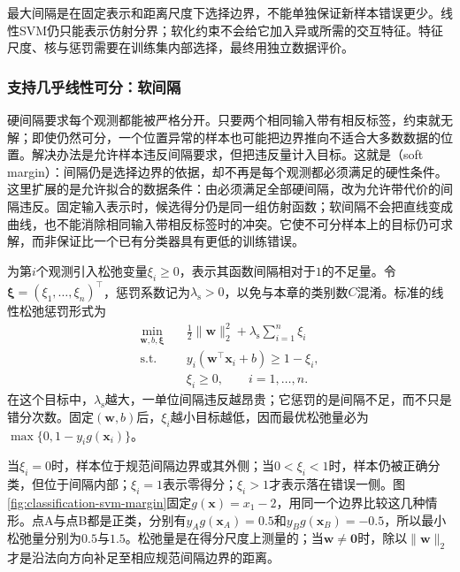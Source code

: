 最大间隔是在固定表示和距离尺度下选择边界，不能单独保证新样本错误更少。线性SVM仍只能表示仿射分界；软化约束不会给它加入异或所需的交互特征。特征尺度、核与惩罚需要在训练集内部选择，最终用独立数据评价。

\subsubsection{支持几乎线性可分：软间隔}
\label{sec:classification-svm-soft-margin}

硬间隔要求每个观测都能被严格分开。只要两个相同输入带有相反标签，约束就无解；即使仍然可分，一个位置异常的样本也可能把边界推向不适合大多数数据的位置。解决办法是允许样本违反间隔要求，但把违反量计入目标。这就是（soft margin）：间隔仍是选择边界的依据，却不再是每个观测都必须满足的硬性条件。这里扩展的是允许拟合的数据条件：由必须满足全部硬间隔，改为允许带代价的间隔违反。固定输入表示时，候选得分仍是同一组仿射函数；软间隔不会把直线变成曲线，也不能消除相同输入带相反标签时的冲突。它使不可分样本上的目标仍可求解，而非保证比一个已有分类器具有更低的训练错误。

为第$i$个观测引入松弛变量$\xi_i\ge0$，表示其函数间隔相对于$1$的不足量。令$\bm{\xi}=(\xi_1,\ldots,\xi_n)^{\top}$，惩罚系数记为$\lambda_{\mathrm{s}}>0$，以免与本章的类别数$C$混淆。标准的线性松弛惩罚形式为
\begin{equation}
  \begin{aligned}
    \min_{\bm{w},b,\bm{\xi}}\quad&
      \frac12\lVert\bm{w}\rVert_2^2
       +\lambda_{\mathrm{s}}\sum_{i=1}^n\xi_i\\
    \text{s.t.}\quad&
      y_i(\bm{w}^{\top}\bm{x}_i+b)\ge1-\xi_i,\\
    &\xi_i\ge0,\qquad i=1,\ldots,n.
  \end{aligned}
  \label{eq:classification-svm-soft-primal}
\end{equation}
在这个目标中，$\lambda_{\mathrm{s}}$越大，一单位间隔违反越昂贵；它惩罚的是间隔不足，而不只是错分次数。固定$(\bm{w},b)$后，$\xi_i$越小目标越低，因而最优松弛量必为$\max\{0,1-y_i g(\bm{x}_i)\}$。

当$\xi_i=0$时，样本位于规范间隔边界或其外侧；当$0<\xi_i<1$时，样本仍被正确分类，但位于间隔内部；$\xi_i=1$表示零得分；$\xi_i>1$才表示落在错误一侧。图\ref{fig:classification-svm-margin}固定$g(\bm{x})=x_1-2$，用同一个边界比较这几种情形。点A与点B都是正类，分别有$y_Ag(\bm{x}_A)=0.5$和$y_Bg(\bm{x}_B)=-0.5$，所以最小松弛量分别为$0.5$与$1.5$。松弛量是在得分尺度上测量的；当$\bm{w}\ne\bm{0}$时，除以$\lVert\bm{w}\rVert_2$才是沿法向方向补足至相应规范间隔边界的距离。

